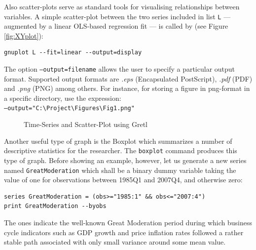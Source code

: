 \documentclass[11pt]{article}
\begin{document}
Also scatter-plots serve as standard tools for visualising relationships between variables. A simple scatter-plot between the two series included in list \texttt{L} --- augmented by a linear OLS-based regression fit --- is called by (see Figure \ref{fig:XYplot}):
\begin{Verbatim}[baselinestretch=0.75, fontsize=\small]
gnuplot L --fit=linear --output=display
\end{Verbatim}
The option \texttt{---output=filename} allows the user to specify a particular output format. Supported output formats are \textit{.eps} (Encapsulated PostScript), \textit{.pdf} (PDF) and \textit{.png} (PNG) among others. For instance, for storing a figure in png-format in a specific directory, use the expression: \\
\texttt{---output="C:\textbackslash{Project}\textbackslash{Figures}\textbackslash{Fig1}.png"}

\begin{figure}[h!]
	\centering

	\caption{Time-Series and Scatter-Plot using Gretl}
	\label{fig:Plot1}
\end{figure}

Another useful type of graph is the Boxplot which summarizes a number of descriptive statistics for the researcher. The \texttt{boxplot} command produces this type of graph. Before showing an example, however, let us generate a new series named \texttt{GreatModeration} which shall be a binary dummy variable taking the value of one for observations between 1985Q1 and 2007Q4, and otherwise zero:
\begin{Verbatim}[baselinestretch=0.75, fontsize=\small]
series GreatModeration = (obs>="1985:1" && obs<="2007:4")
print GreatModeration --byobs
\end{Verbatim}
The ones indicate the well-known Great Moderation period during which business cycle indicators such as GDP growth and price inflation rates followed a rather stable path associated with only small variance around some mean value.
\end{document}
